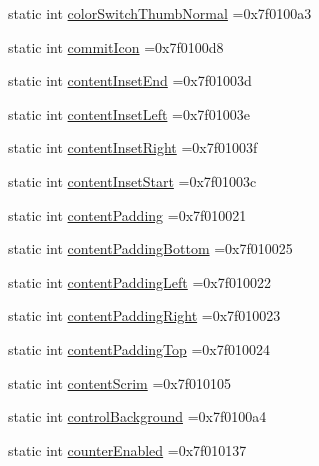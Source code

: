 \begin{DoxyCompactItemize}
static int \hyperlink{classandroid_1_1support_1_1v7_1_1mediarouter_1_1R_1_1attr_a4ba590583f4d6afa70e3b4d78c92e2bc}{color\+Switch\+Thumb\+Normal} =0x7f0100a3
\item 
static int \hyperlink{classandroid_1_1support_1_1v7_1_1mediarouter_1_1R_1_1attr_a0800b9b67e1f73a4a0923cf4e1122759}{commit\+Icon} =0x7f0100d8
\item 
static int \hyperlink{classandroid_1_1support_1_1v7_1_1mediarouter_1_1R_1_1attr_a1e18403cb2eb932c1f1398fb56b2b848}{content\+Inset\+End} =0x7f01003d
\item 
static int \hyperlink{classandroid_1_1support_1_1v7_1_1mediarouter_1_1R_1_1attr_a00da2882f3185a4fb35023d1fa0fb37a}{content\+Inset\+Left} =0x7f01003e
\item 
static int \hyperlink{classandroid_1_1support_1_1v7_1_1mediarouter_1_1R_1_1attr_ac57c06096a1114b7df0d88f8fe7d666b}{content\+Inset\+Right} =0x7f01003f
\item 
static int \hyperlink{classandroid_1_1support_1_1v7_1_1mediarouter_1_1R_1_1attr_a26b877aa26d7c68054fe041baffc1882}{content\+Inset\+Start} =0x7f01003c
\item 
static int \hyperlink{classandroid_1_1support_1_1v7_1_1mediarouter_1_1R_1_1attr_af766688b56306f179e9dcdc4986c471d}{content\+Padding} =0x7f010021
\item 
static int \hyperlink{classandroid_1_1support_1_1v7_1_1mediarouter_1_1R_1_1attr_a4e2c931123e93be190daf6768973d35e}{content\+Padding\+Bottom} =0x7f010025
\item 
static int \hyperlink{classandroid_1_1support_1_1v7_1_1mediarouter_1_1R_1_1attr_a5cd1edc7348ee2fafe0dbdec252e01f2}{content\+Padding\+Left} =0x7f010022
\item 
static int \hyperlink{classandroid_1_1support_1_1v7_1_1mediarouter_1_1R_1_1attr_ad77e97d2c06c9038049d3d298e4d171d}{content\+Padding\+Right} =0x7f010023
\item 
static int \hyperlink{classandroid_1_1support_1_1v7_1_1mediarouter_1_1R_1_1attr_a612977c1ba0bac751e77b8512e53743a}{content\+Padding\+Top} =0x7f010024
\item 
static int \hyperlink{classandroid_1_1support_1_1v7_1_1mediarouter_1_1R_1_1attr_a805598343f4fecc958998b8eb6d74a18}{content\+Scrim} =0x7f010105
\item 
static int \hyperlink{classandroid_1_1support_1_1v7_1_1mediarouter_1_1R_1_1attr_a2979564b8ef31e5cdbaeefe947ce53dd}{control\+Background} =0x7f0100a4
\item 
static int \hyperlink{classandroid_1_1support_1_1v7_1_1mediarouter_1_1R_1_1attr_a27efdede37a68aaeeb31d34c5648e300}{counter\+Enabled} =0x7f010137

\end{DoxyCompactItemize}
